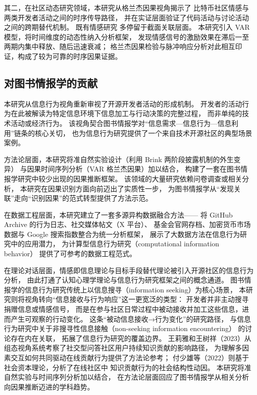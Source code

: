 其二，在社区动态研究领域，本研究从格兰杰因果视角揭示了
比特币社区情感与两类开发者活动之间的时序传导路径，
并在实证层面验证了代码活动与讨论活动之间的跨期替代机制。
既有情感研究\cite{guzzi2013,yang2021differential,zhang2024ugc}
多停留于截面关联层面。
本研究引入 VAR 模型，将时间维度的动态性纳入分析框架，
发现情感信号的激励效果在滞后一至两期内集中释放、随后迅速衰减；
格兰杰因果检验与脉冲响应分析对此相互印证，构成了较为可靠的时序因果证据。

\subsection{对图书情报学的贡献}

本研究从信息行为视角重新审视了开源开发者活动的形成机制。
开发者的活动行为在此被解读为特定信息环境下信息加工与行动决策的完整过程，
而非单纯的技术活动或经济行为。
该视角契合图书情报学对“信息需求—信息行为—信息利用”链条的核心关切，
也为信息行为研究提供了一个来自技术开源社区的典型场景案例。

方法论层面，本研究将准自然实验设计（利用 Brink 两阶段披露机制的外生变异）
与因果时间序列分析（VAR 格兰杰因果）加以结合，
构建了一套在图书情报学研究中较少出现的因果推断框架。
该领域的大量研究依赖问卷调查或相关分析，
本研究在因果识别方面向前迈出了实质性一步，
为图书情报学从“发现关联”走向“识别因果”的范式转型提供了方法示范。

在数据工程层面，本研究建立了一套多源异构数据融合方法——
将 GitHub Archive 的行为日志、社交媒体帖文（X 平台）、
基金会官网存档、加密货币市场数据与 Google 搜索指数整合为统一分析框架，
展示了大数据方法在信息行为研究中的应用潜力，
为计算型信息行为研究（computational information behavior）
提供了可参考的数据工程范式。

在理论对话层面，情感即信息理论与目标手段替代理论被引入开源社区的信息行为分析，
由此打通了认知心理学理论与信息行为研究框架之间的概念通道。
图书情报学的信息行为研究传统上以信息搜寻（information seeking）为核心场景，
本研究则将视角转向“信息接收与行为响应”这一更宽泛的类型：
开发者并非主动搜寻捐赠信息或情感信号，
而是在参与社区日常过程中被动接收并加工这些信息，进而产生可观察的行动变化。
这条“被动信息接收→行为变化”的研究路径，
与信息行为研究中关于非搜寻性信息接触（non-seeking information encountering）
的讨论存在内在关联\cite{sun2017motivation}，
拓展了信息行为研究的覆盖边界。
王莉雅和王树祥（2023）从组态视角系统考察了社交型问答社区用户持续知识贡献的影响路径，
为理解多因素交互如何共同驱动在线贡献行为提供了方法论参考\cite{wang2023config}；
付少雄等（2022）则基于社会资本理论，分析了在线社区中
知识贡献行为的社会结构性动因\cite{fu2022social}。
本研究将准自然实验与时间序列分析加以结合，
在方法论层面回应了图书情报学从相关分析向因果推断迈进的学科趋势。

